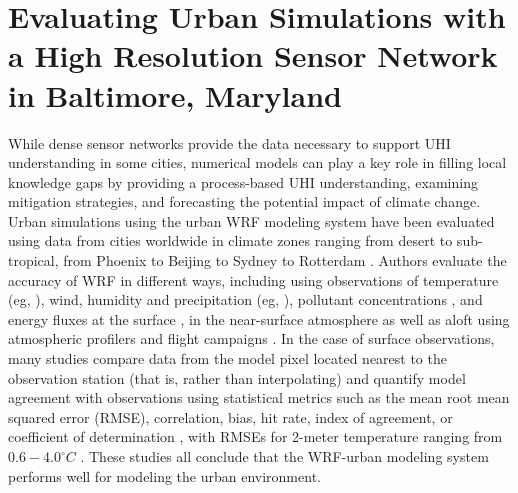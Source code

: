 \chapter{Evaluating Urban Simulations with a High Resolution Sensor Network in Baltimore, Maryland}
\label{chap:bmore2}

While dense sensor networks provide the data necessary to support UHI understanding in some cities, 
numerical models can play a key role in filling local knowledge gaps by providing a process-based UHI understanding, examining mitigation strategies, and forecasting the potential impact of climate change. 
Urban simulations using the urban WRF modeling system \citep{chen2011integrated} have been evaluated using data from cities worldwide in climate zones ranging from desert to sub-tropical, from Phoenix \citep{georgescu2013summer} to Beijing \citep{wang2013modeling} to Sydney \citep{argueso2014temperature} to Rotterdam \citep{theeuwes2014seasonal}. 
Authors evaluate the accuracy of WRF in different ways,
including using observations of temperature (eg, \citet{kusaka2012numerical}), wind, humidity and precipitation (eg, \cite{miao2011impacts,chen2011numerical}), pollutant concentrations \citep{brioude2013top}, and energy fluxes at the surface \citep{yang2015enhancing,loridan2012multi}, in the near-surface atmosphere as well as aloft using atmospheric profilers and flight campaigns \citep{li2013development}. 
In the case of surface observations, many studies compare data from the model pixel located nearest to the observation station (that is, rather than interpolating) and quantify model agreement with observations using statistical metrics such as the mean root mean squared error (RMSE), correlation, bias, hit rate, index of agreement, or coefficient of determination \citep{loridan2010trade,salamanca2011study,lee2011evaluation,chen2011numerical,chen2014wrf,li2013multi}, with RMSEs for 2-meter temperature ranging from $0.6-4.0^\circ C$ \citep{kim2013evaluation}. These studies 
all conclude that the WRF-urban modeling system performs well for modeling the urban environment. %

